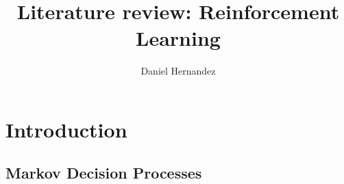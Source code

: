 \documentclass{article}
\title{\textbf{Literature review: Reinforcement Learning}}
\author{Daniel Hernandez}
\date{ }
\begin{document}
\maketitle


% 
% 
\section{Introduction}


    \subsection{Markov Decision Processes}
    
    
% 
% 
% 
% 

%





\end{document}
